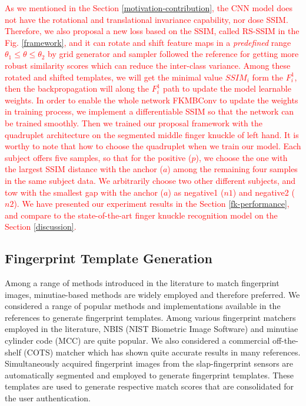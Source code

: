 \textcolor{red}{As we mentioned in the Section \ref{motivation-contribution}, the CNN model does not have the rotational and translational invariance capability, nor dose SSIM. Therefore, we also proposal a new loss based on the SSIM, called RS-SSIM in the Fig. \ref{framework}, and it can rotate and shift feature maps in a \textit{predefined} range $\theta_1 \leq \theta \leq \theta_2$ by grid generator and sampler followed the reference \cite{jaderberg2015spatial} for getting more robust similarity scores which can reduce the inter-class variance. Among these rotated and shifted templates, we will get the minimal value $SSIM_i$ form the $F_i^1$, then the backpropagation will along the $F_i^1$ path to update the model learnable weights. In order to enable the whole network FKMBConv to update the weights in training process, we implement a differentiable SSIM so that the network can be trained smoothly. Then we trained our proposal framework with the quadruplet architecture \cite{chen2017beyond} on the segmented middle finger knuckle of left hand. It is worthy to note that how to choose the quadruplet when we train our model. Each subject offers five samples, so that for the positive ($p$), we choose the one with the largest SSIM distance with the anchor ($a$) among the remaining four samples in the same subject data. We arbitrarily choose two other different subjects, and tow with the smallest gap with the anchor ($a$) as negative1 ($n1$) and negative2 ($n2$). We have presented our experiment results in the Section \ref{fk-performance}, and compare to the state-of-the-art finger knuckle recognition model on the Section \ref{discussion}.}


\subsection{Fingerprint Template Generation\label{fp-template}}

Among a range of methods introduced in the literature \cite{maltoni2009handbook} to match fingerprint images, minutiae-based methods are widely employed and therefore preferred. We considered a range of popular methods and implementations available in the references to generate fingerprint templates. Among various fingerprint matchers employed in the literature, NBIS (NIST Biometric Image Software) \cite{cappelli2010minutia} and minutiae cylinder code (MCC) \cite{watson2007user} are quite popular. We also considered a commercial off-the-shelf (COTS) matcher \cite{verifinger} which has shown quite accurate results in many references. Simultaneously acquired fingerprint images from the slap-fingerprint sensors are automatically segmented and employed to generate fingerprint templates. These templates are used to generate respective match scores that are consolidated for the user authentication. 

